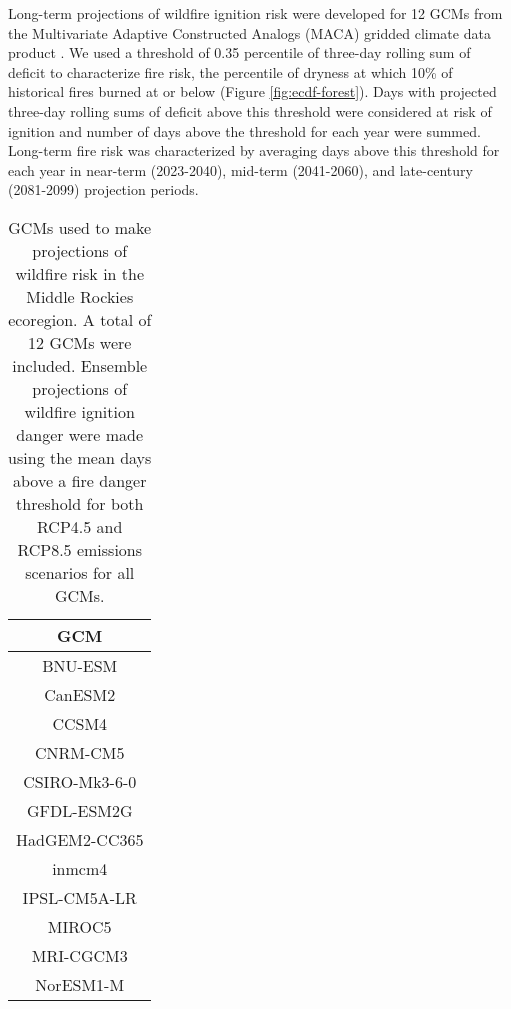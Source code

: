 \documentclass[11p]{article}
\begin{document}
Long-term projections of wildfire ignition risk were developed for 12 GCMs from the Multivariate Adaptive Constructed Analogs (MACA) gridded climate data product \citep{abatzoglouComparisonStatisticalDownscaling2012}. We used a threshold of 0.35 percentile of three-day rolling sum of deficit to characterize fire risk, the percentile of dryness at which 10\% of historical fires burned at or below (Figure \ref{fig:ecdf-forest}). Days with projected three-day rolling sums of deficit above this threshold were considered at risk of ignition and number of days above the threshold for each year were summed. Long-term fire risk was characterized by averaging days above this threshold for each year in near-term (2023-2040), mid-term (2041-2060), and late-century (2081-2099) projection periods. 

\begin{table}[htbp]
  \centering
  \begin{tabular}{ c }
    \hline
    GCM \\
    \hline
    BNU-ESM \\
    CanESM2 \\
    CCSM4 \\
    CNRM-CM5 \\
    CSIRO-Mk3-6-0 \\
    GFDL-ESM2G \\
    HadGEM2-CC365 \\
    inmcm4 \\
    IPSL-CM5A-LR \\
    MIROC5 \\
    MRI-CGCM3 \\
    NorESM1-M \\
    \hline
  \end{tabular}
  \caption{GCMs used to make projections of wildfire risk in the Middle Rockies ecoregion. A total of 12 GCMs were included. Ensemble projections of wildfire ignition danger were made using the mean days above a fire danger threshold for both RCP4.5 and RCP8.5 emissions scenarios for all GCMs.}
  \label{table:gcms}
\end{table}


\end{document}
